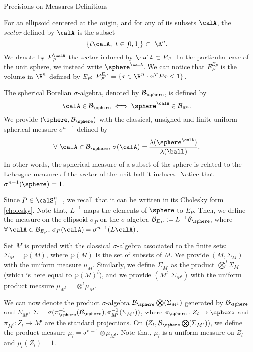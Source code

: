 \begin{section}{Precisions on Measures Definitions}\label{app:measures}

For an ellipsoid centered at the origin, and for any of its subsets $\calA$, the \emph{sector} defined by $\calA$ is the subset $$\{t \calA, \ t \in [0,1]\} \subset\ \R^n.$$ We denote by $E_P^{\calA}$ the sector induced by $\calA \subset E_P$. In the particular case of the unit sphere, we instead write $\sphere^{\calA}$. We can notice that $E_P^{E_P}$ is the volume in $\R^n$ defined by $E_P$: $E_P^{E_P} = \{x \in \R^n: x^TPx \leq 1\}$.

The spherical Borelian $\sigma$-algebra, denoted by $\mathcal{B}_{\sphere}$, is defined by $$\calA \in \mathcal{B}_{\sphere} \iff \sphere^{\calA} \in \mathcal{B}_{\mathbb{R}^n}.$$ We provide $(\sphere,\mathcal{B}_{\sphere})$ with the classical, unsigned and finite uniform spherical measure $\sigma^{n-1}$ defined by
$$\forall\ \calA \in \mathcal{B}_{\sphere},\, \sigma(\calA) = \frac{\lambda(\sphere^{\calA})}{\lambda(\ball)}. $$
In other words, the spherical measure of a subset of the sphere is related to the Lebesgue measure of the sector of the unit ball it induces. Notice that $\sigma^{n-1}(\sphere) = 1$.

Since $P \in \calS_{++}^n$, we recall that it can be written in its Cholesky form \eqref{cholesky}. Note that, $L^{-1}$ maps the elements of $\sphere$ to $E_P$. Then, we define the measure on the ellipsoid $\sigma_P$ on the $\sigma$-algebra $\mathcal{B}_{E_P}:=L^{-1}\mathcal{B}_\sphere$, where $\forall\, \calA \in \mathcal{B}_{E_P},\, \sigma_P({\calA}) = \sigma^{n-1}(L\calA)$. 

Set $M$ is provided with the classical $\sigma$-algebra associated to the finite sets: $\Sigma_M = \wp(M)$, where $\wp(M)$ is the set of subsets of $M$. We provide $(M, \Sigma_M)$ with the uniform measure $\mu_M$. Similarly, we define $\Sigma_{M^l}$ as the product $\bigotimes^l \Sigma_M$ (which is here equal to $\wp(M)^l$), and we provide $(M^l, \Sigma_{M^l})$ with the uniform product measure $\mu_{M^l} = \otimes^l \mu_M$.

We can now denote the product $\sigma$-algebra $\mathcal{B}_{\sphere} \bigotimes (\Sigma_{M^l})$ generated by $\mathcal{B}_{\sphere}$ and $\Sigma_{M^l}$: $\Sigma = \sigma( \pi_{\sphere}^{-1}(\mathcal{B}_{\sphere}),  \pi_{M^l}^{-1}(\Sigma_{M^l}))$, where $\pi_{\sphere}: Z_l \to \sphere$ and $\pi_{M^l}: Z_l \to M^l$ are the standard projections. On $(Z_l,\mathcal{B}_{\sphere} \bigotimes (\Sigma_{M^l}) )$, we define the product measure $\mu_l = \sigma^{n-1} \otimes \mu_{M^l}$. Note that, $\mu_l$ is a uniform measure on $Z_l$ and $\mu_l(Z_l)=1$.  

\end{section}


